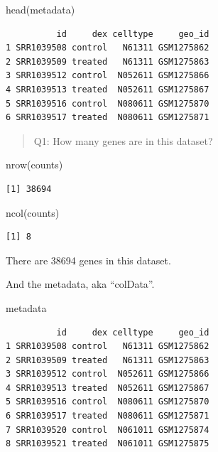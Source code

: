 \documentclass[
  letterpaper,
  DIV=11,
  numbers=noendperiod]{scrartcl}
\newenvironment{Shaded}{\begin{snugshade}}{\end{snugshade}}
\newcommand{\FunctionTok}[1]{\textcolor[rgb]{0.28,0.35,0.67}{#1}}
\newcommand{\NormalTok}[1]{\textcolor[rgb]{0.00,0.23,0.31}{#1}}
\begin{document}
\begin{Shaded}
\begin{Highlighting}[]
\FunctionTok{head}\NormalTok{(metadata)}
\end{Highlighting}
\end{Shaded}

\begin{verbatim}
          id     dex celltype     geo_id
1 SRR1039508 control   N61311 GSM1275862
2 SRR1039509 treated   N61311 GSM1275863
3 SRR1039512 control  N052611 GSM1275866
4 SRR1039513 treated  N052611 GSM1275867
5 SRR1039516 control  N080611 GSM1275870
6 SRR1039517 treated  N080611 GSM1275871
\end{verbatim}

\begin{quote}
Q1: How many genes are in this dataset?
\end{quote}

\begin{Shaded}
\begin{Highlighting}[]
\FunctionTok{nrow}\NormalTok{(counts)}
\end{Highlighting}
\end{Shaded}

\begin{verbatim}
[1] 38694
\end{verbatim}

\begin{Shaded}
\begin{Highlighting}[]
\FunctionTok{ncol}\NormalTok{(counts)}
\end{Highlighting}
\end{Shaded}

\begin{verbatim}
[1] 8
\end{verbatim}

There are 38694 genes in this dataset.

And the metadata, aka ``colData''.

\begin{Shaded}
\begin{Highlighting}[]
\NormalTok{metadata}
\end{Highlighting}
\end{Shaded}

\begin{verbatim}
          id     dex celltype     geo_id
1 SRR1039508 control   N61311 GSM1275862
2 SRR1039509 treated   N61311 GSM1275863
3 SRR1039512 control  N052611 GSM1275866
4 SRR1039513 treated  N052611 GSM1275867
5 SRR1039516 control  N080611 GSM1275870
6 SRR1039517 treated  N080611 GSM1275871
7 SRR1039520 control  N061011 GSM1275874
8 SRR1039521 treated  N061011 GSM1275875
\end{verbatim}
\end{document}
